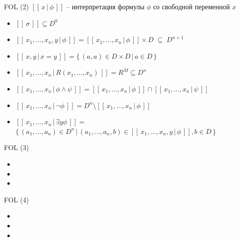 \documentclass{beamer}
\begin{document}
\begin{frame}{FOL (2)}
$[ \! [ \, x \, \vert \, \phi \, ] \! ]$ -- интерпретация формулы $\phi$ со свободной переменной $x$\\
\bigskip
\begin{small}
\begin{itemize}
	\item $[ \! [ \, \sigma \, ] \! ] \subseteq D^0$ 
	\item $[ \! [ \, x_1, \ldots, x_n, y \, \vert \, \phi \, ] \! ] = [ \! [ \, x_1, \ldots, x_n \, \vert \, \phi \, ] \! ] \times D \; \subseteq \; D^{n+1}$ 
	\item $[ \! [ \, x, y \, \vert \, x = y \, ] \! ] = \{ \, (a, a) \in D \times D \, \vert \, a \in D \, \}$ 
	\item $[ \! [ \, x_1, \ldots, x_n \, \vert \, R(x_1, \ldots, x_n) \, ] \! ] = R^M \subseteq D^n$ 
	\item $[ \! [ \, x_1, \ldots, x_n \, \vert \, \phi \wedge \psi \, ] \! ] = [ \! [ \, x_1, \ldots, x_n \, \vert \, \phi \, ] \! ] \cap [ \! [ \, x_1, \ldots, x_n \, \vert \, \psi \, ] \! ]$ 
	\item $[ \! [ \, x_1, \ldots, x_n \, \vert \, \neg \phi \, ] \! ] = D^n \setminus [ \! [ \, x_1, \ldots, x_n \, \vert \, \phi \, ] \! ]$
	\item $[ \! [ \, x_1, \ldots, x_n \, \vert \, \exists y \phi \, ] \! ] = $\\ \smallskip $\{ \, (a_1, \ldots, a_n) \in D^n \, \vert \, (a_1, \ldots, a_n, b) \in [ \! [ \, x_1, \ldots, x_n, y \, \vert \, \phi \, ] \! ], b \in D \, \}$
\end{itemize}
\end{small}
\end{frame}

\begin{frame}{FOL (3)}
\begin{itemize}
	\item
	\item
	\item
\end{itemize}
\end{frame}

\begin{frame}{FOL (4)}
\begin{itemize}
	\item
	\item
	\item
\end{itemize}
\end{frame}
\end{document}
